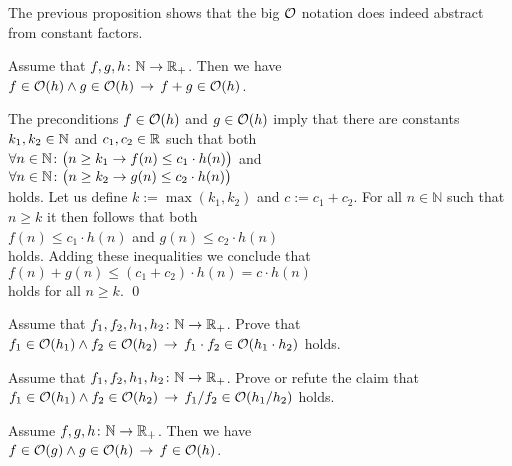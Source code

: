 \remark 
The previous proposition shows that the big $\mathcal{O}$ notation does indeed abstract
from constant factors. \eox

\begin{Proposition}[Addition]
Assume that $f,g,h \colon {\mathbb N} \rightarrow {{\mathbb R}_+}$. Then we have 
\\[0.2cm]
\hspace*{1.3cm}
$f \in \mathcal{O}(h) \wedge g \in \mathcal{O}(h) \,\rightarrow\, f + g \in \mathcal{O}(h)$.
\end{Proposition}

\proof
The preconditions $f \in \mathcal{O}(h)$ and $g \in \mathcal{O}(h)$ imply that there are constants $k_1,k_2\in {\mathbb N}$
and $c_1,c_2\in {\mathbb R}$ such that both \\[0.2cm]
\hspace*{1.3cm} 
$\forall n \in {\mathbb N} \colon \bigl( n \geq k_1 \rightarrow f(n) \leq c_1 \cdot h(n)\bigr)$ 
\quad and
\\[0.2cm]
\hspace*{1.3cm} 
$\forall n \in {\mathbb N} \colon\bigl( n \geq k_2 \rightarrow g(n) \leq c_2 \cdot h(n)\bigr)$
\\[0.2cm]
holds.  Let us define $k := \max(k_1,k_2)$ and $c:= c_1 + c_2$.  For all $n \in \mathbb{N}$ such
that $n \geq k$ it then follows that both
\\[0.2cm]
\hspace*{1.3cm}
 $f(n) \leq c_1 \cdot h(n)$ \quad and \quad  $g(n) \leq c_2 \cdot h(n)$
\\[0.2cm]
holds.  Adding these inequalities we conclude that 
\\[0.2cm]
\hspace*{1.3cm} $f(n) + g(n) \leq (c_1 + c_2) \cdot h(n) = c \cdot h(n)$
\\[0.2cm]
holds for all $n \geq k$.
\qed

\exercise
Assume that $f_1,f_2,h_1,h_2 \colon {\mathbb N} \rightarrow {{\mathbb R}_+}$.  Prove that 
\\[0.2cm]
\hspace*{1.3cm}
$f_1 \in \mathcal{O}(h_1) \wedge f_2 \in \mathcal{O}(h_2) \,\rightarrow\, f_1 \cdot f_2 \in \mathcal{O}(h_1 \cdot h_2)$
\quad holds.  \eox


\exercise
Assume that $f_1,f_2,h_1,h_2 \colon {\mathbb N} \rightarrow {{\mathbb R}_+}$.  Prove or refute the claim that 
\\[0.2cm]
\hspace*{1.3cm}
$f_1 \in \mathcal{O}(h_1) \wedge f_2 \in \mathcal{O}(h_2) \,\rightarrow\, f_1 / f_2 \in \mathcal{O}(h_1 / h_2)$
\quad holds.  \eox

\begin{Proposition} 
Assume $f,g,h \colon {\mathbb N} \rightarrow {{\mathbb R}_+}$. Then we have \\[0.2cm]
\hspace*{1.3cm}
 $f \in \mathcal{O}(g) \wedge g \in \mathcal{O}(h) \,\rightarrow\, f \in \mathcal{O}(h)$.

\end{Proposition}

